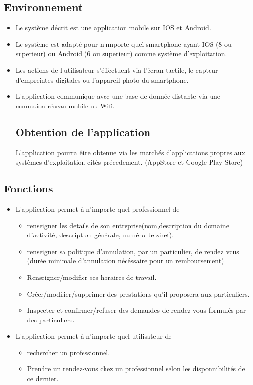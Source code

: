 \documentclass{article}
\begin{document}
\subsection{Environnement}
\begin{itemize}
\item Le système décrit est une application mobile sur IOS et
Android.
\item Le système est adapté pour n'importe quel smartphone ayant IOS (8 ou superieur) ou Android (6 ou superieur) comme
système d'exploitation.
\item Les actions de l'utilisateur s'éffectuent via l'écran
  tactile, le capteur d'empreintes digitales ou l'appareil photo du smartphone.
\item L'application communique avec une base de donnée distante
  via une connexion \og réseau mobile\fg{} ou Wifi.
\subsection{Obtention de l'application}
L'application pourra être obtenue via les marchés d'applications propres aux systèmes d'exploitation cités précedement.
(AppStore et Google Play Store)

\end{itemize}
\subsection{Fonctions}
\begin{itemize}
\item L'application permet à n'importe quel professionnel de 

	\begin{itemize}
	\item renseigner les details de son entreprise(nom,description du
	domaine d'activité, description générale, numéro de siret).
	\item renseigner sa politique d'annulation, par un particulier, de rendez vous (durée minimale d'annulation nécéssaire pour un remboursement)
	\item Renseigner/modifier ses horaires de travail.
	\item Créer/modifier/supprimer des prestations qu'il proposera aux particuliers.
	\item Inspecter et confirmer/refuser des demandes de rendez vous formulés par des particuliers.
	\end{itemize}
\item L'application permet à n'importe quel utilisateur de

 	\begin{itemize}
	\item rechercher un professionnel.
	\item Prendre un rendez-vous chez un professionnel selon les disponnibilités de
	ce dernier.
	\end{itemize}
\end{itemize}
\end{document}
